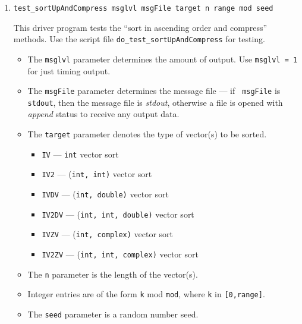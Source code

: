 \begin{enumerate}
\begin{itemize}
\begin{itemize}
\item {\tt ID} --- descending insert sort
\item {\tt QU} --- ascending quick sort
\item {\tt QD} --- descending quick sort
\end{itemize}
\item
The {\tt n} parameter is the length of the vector(s).
\item
Integer entries are of the form {\tt k} mod {\tt mod},
where {\tt k} in {\tt [0,range]}.
\item
The {\tt seed} parameter is a random number seed.
\end{itemize}
\item
\begin{verbatim}
test_sortUpAndCompress msglvl msgFile target n range mod seed
\end{verbatim}
This driver program tests the ``sort in ascending order and
compress'' methods.
Use the script file {\tt do\_test\_sortUpAndCompress} for testing.
\par
\begin{itemize}
\item
The {\tt msglvl} parameter determines the amount of output.
Use {\tt msglvl = 1} for just timing output.
\item
The {\tt msgFile} parameter determines the message file --- if {\tt
msgFile} is {\tt stdout}, then the message file is {\it stdout},
otherwise a file is opened with {\it append} status to receive any
output data.
\item
The {\tt target} parameter denotes the type of vector(s) to be
sorted.
\begin{itemize}
\item {\tt IV} --- {\tt int} vector sort
\item {\tt IV2} --- {(\tt int, int)} vector sort
\item {\tt IVDV} --- {(\tt int, double)} vector sort
\item {\tt IV2DV} --- {(\tt int, int, double)} vector sort
\item {\tt IVZV} --- {(\tt int, complex)} vector sort
\item {\tt IV2ZV} --- {(\tt int, int, complex)} vector sort
\end{itemize}
\item
The {\tt n} parameter is the length of the vector(s).
\item
Integer entries are of the form {\tt k} mod {\tt mod},
where {\tt k} in {\tt [0,range]}.
\item
The {\tt seed} parameter is a random number seed.
\end{itemize}
\end{enumerate}
